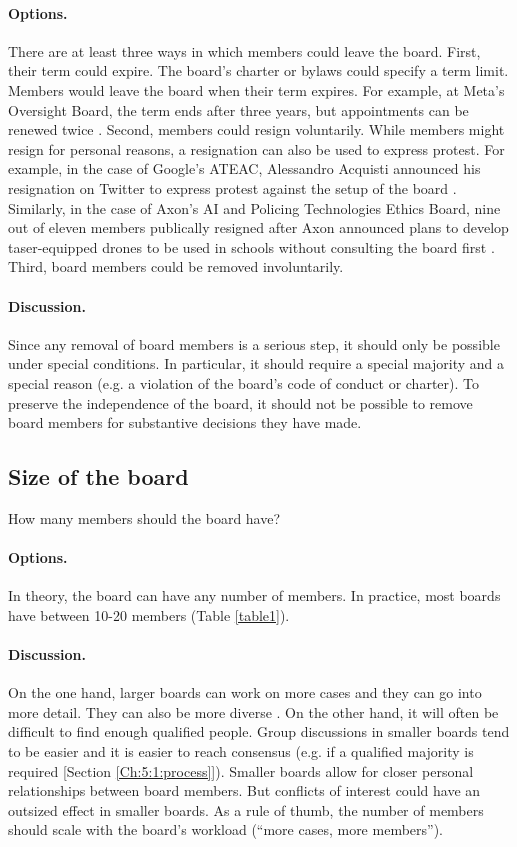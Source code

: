 \documentclass{article}
\begin{document}
\paragraph{Options.} There are at least three ways in which members could leave the board. First, their term could expire. The board’s charter or bylaws could specify a term limit. Members would leave the board when their term expires. For example, at Meta’s Oversight Board, the term ends after three years, but appointments can be renewed twice \cite{oversight2023charter}. Second, members could resign voluntarily. While members might resign for personal reasons, a resignation can also be used to express protest. For example, in the case of Google’s ATEAC, Alessandro Acquisti announced his resignation on Twitter to express protest against the setup of the board \cite{acquisti2019tweet}. Similarly, in the case of Axon’s AI and Policing Technologies Ethics Board, nine out of eleven members publically resigned after Axon announced plans to develop taser-equipped drones to be used in schools without consulting the board first \cite{policing2022resigning}. Third, board members could be removed involuntarily.

\paragraph{Discussion.} Since any removal of board members is a serious step, it should only be possible under special conditions. In particular, it should require a special majority and a special reason (e.g. a violation of the board’s code of conduct or charter). To preserve the independence of the board, it should not be possible to remove board members for substantive decisions they have made.

\subsection{Size of the board}\label{Ch:4:3:size}

How many members should the board have?

\paragraph{Options.} In theory, the board can have any number of members. In practice, most boards have between 10-20 members (Table \ref{table1}).

\paragraph{Discussion.} On the one hand, larger boards can work on more cases and they can go into more detail. They can also be more diverse \cite{gupta2020ai}. On the other hand, it will often be difficult to find enough qualified people. Group discussions in smaller boards tend to be easier and it is easier to reach consensus (e.g. if a qualified majority is required [Section \ref{Ch:5:1:process}]). Smaller boards allow for closer personal relationships between board members. But conflicts of interest could have an outsized effect in smaller boards. As a rule of thumb, the number of members should scale with the board’s workload (“more cases, more members”).
\end{document}
